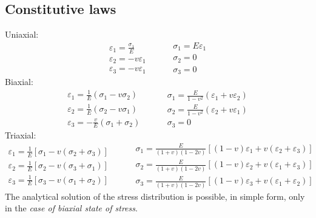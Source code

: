 \subsection{Constitutive laws}
Uniaxial:
\begin{equation}
  \begin{array}{l}
    \varepsilon_1 = \frac{\sigma_1}{E} \\
    \varepsilon_2 = -v\varepsilon_1    \\
    \varepsilon_3 = -v\varepsilon_1
  \end{array} \hspace{1cm}
  \begin{array}{l}
    \sigma_1 = E\varepsilon_1 \\
    \sigma_2 = 0              \\
    \sigma_3 = 0
  \end{array}
\end{equation}
Biaxial:
\begin{equation}
  \begin{array}{l}
    \varepsilon_1 = \frac{1}{E} \left(\sigma_1 - v\sigma_2\right) \\
    \varepsilon_2 = \frac{1}{E} \left(\sigma_2 - v\sigma_1\right) \\
    \varepsilon_3 = -\frac{v}{E} \left(\sigma_1 + \sigma_2\right)
  \end{array} \hspace{1cm}
  \begin{array}{l}
    \sigma_1 = \frac{E}{1-v^2} \left(\varepsilon_1 + v\varepsilon_2\right) \\
    \sigma_2 = \frac{E}{1-v^2} \left(\varepsilon_2 + v\varepsilon_1\right) \\
    \sigma_3 = 0
  \end{array}
\end{equation}
Triaxial:
\begin{equation}
  \begin{array}{l}
    \varepsilon_1 = \frac{1}{E}\left[\sigma_1 - v\left(\sigma_2 + \sigma_3\right)\right] \\
    \varepsilon_2 = \frac{1}{E}\left[\sigma_2 - v\left(\sigma_3 + \sigma_1\right)\right] \\
    \varepsilon_3 = \frac{1}{E}\left[\sigma_3 - v\left(\sigma_1 + \sigma_2\right)\right]
  \end{array} \hspace{1cm}
  \begin{array}{l}
    \sigma_1 = \frac{E}{\left(1+v\right)\left(1-2v\right)} \left[\left(1-v\right)\varepsilon_1 + v\left(\varepsilon_2 + \varepsilon_3\right)\right] \\
    \sigma_2 = \frac{E}{\left(1+v\right)\left(1-2v\right)} \left[\left(1-v\right)\varepsilon_2 + v\left(\varepsilon_1 + \varepsilon_3\right)\right] \\
    \sigma_3 = \frac{E}{\left(1+v\right)\left(1-2v\right)} \left[\left(1-v\right)\varepsilon_3 + v\left(\varepsilon_1 + \varepsilon_2\right)\right]
  \end{array}
\end{equation}
The analytical solution of the stress distribution is possible, in simple form, only in the \textit{case of biaxial state of stress}.
